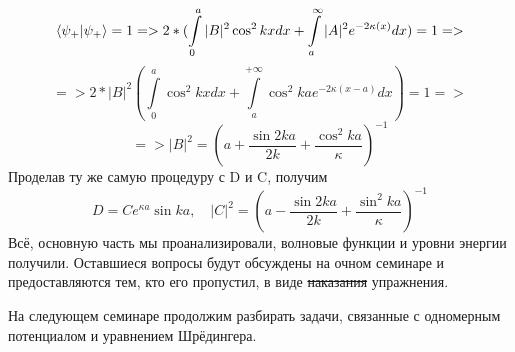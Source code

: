 \[
\braket{\psi_+} = 1 => 2 * (\int\limits_0^a |B|^2\cos^2 kx dx + \int\limits_a^\infty |A|^2e^{-2\kappa(x)} dx) = 1 =>
\]
\[
 => 2 *|B|^2 (\int\limits_0^a \cos^2 kx dx + \int\limits_a^{+\infty }\cos^2 kae^{-2\kappa(x-a)} dx) = 1 =>
\]
\[
=> |B|^2 = (a + \frac{\sin 2ka}{2k} + \frac{\cos^2 ka}{\kappa})^{-1} 
\]
Проделав ту же самую процедуру с D и C, получим
\[
D = Ce^{\kappa a}\sin ka, \quad |C|^2 = (a - \frac{\sin 2ka}{2k} + \frac{\sin^2 ka}{\kappa})^{-1}
\]
Всё, основную часть мы проанализировали, волновые функции и уровни энергии получили. Оставшиеся вопросы будут обсуждены на очном семинаре и предоставляются тем, кто его пропустил, в виде \sout{наказания} упражнения.

На следующем семинаре продолжим разбирать задачи, связанные с одномерным потенциалом и уравнением Шрёдингера.
